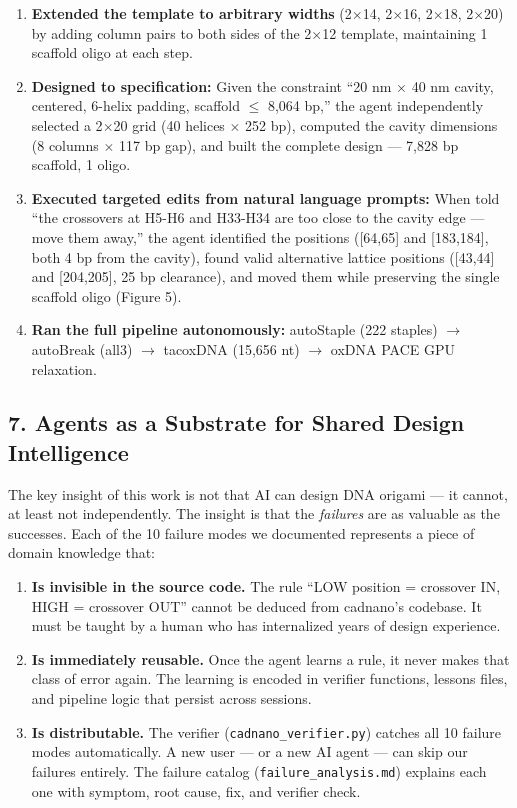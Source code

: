 \documentclass[
  11pt,
]{article}
\providecommand{\tightlist}{%
  \setlength{\itemsep}{0pt}\setlength{\parskip}{0pt}}
\begin{document}
\begin{enumerate}
\def\labelenumi{\arabic{enumi}.}
\tightlist
\item
  \textbf{Extended the template to arbitrary widths} (2$\times$14, 2$\times$16, 2$\times$18,
  2$\times$20) by adding column pairs to both sides of the 2$\times$12 template,
  maintaining 1 scaffold oligo at each step.
\item
  \textbf{Designed to specification:} Given the constraint ``20 nm $\times$ 40
  nm cavity, centered, 6-helix padding, scaffold $\leq$ 8,064 bp,'' the agent
  independently selected a 2$\times$20 grid (40 helices $\times$ 252 bp), computed the
  cavity dimensions (8 columns $\times$ 117 bp gap), and built the complete
  design --- 7,828 bp scaffold, 1 oligo.
\item
  \textbf{Executed targeted edits from natural language prompts:} When
  told ``the crossovers at H5-H6 and H33-H34 are too close to the cavity
  edge --- move them away,'' the agent identified the positions
  ({[}64,65{]} and {[}183,184{]}, both 4 bp from the cavity), found
  valid alternative lattice positions ({[}43,44{]} and {[}204,205{]}, 25
  bp clearance), and moved them while preserving the single scaffold
  oligo (Figure 5).
\item
  \textbf{Ran the full pipeline autonomously:} autoStaple (222 staples)
  $\to$ autoBreak (all3) $\to$ tacoxDNA (15,656 nt) $\to$ oxDNA PACE GPU relaxation.
\end{enumerate}

\subsection{7. Agents as a Substrate for Shared Design
Intelligence}\label{agents-as-a-substrate-for-shared-design-intelligence}

The key insight of this work is not that AI can design DNA origami ---
it cannot, at least not independently. The insight is that the
\emph{failures} are as valuable as the successes. Each of the 10 failure
modes we documented represents a piece of domain knowledge that:

\begin{enumerate}
\def\labelenumi{\arabic{enumi}.}
\tightlist
\item
  \textbf{Is invisible in the source code.} The rule ``LOW position =
  crossover IN, HIGH = crossover OUT'' cannot be deduced from cadnano's
  codebase. It must be taught by a human who has internalized years of
  design experience.
\item
  \textbf{Is immediately reusable.} Once the agent learns a rule, it
  never makes that class of error again. The learning is encoded in
  verifier functions, lessons files, and pipeline logic that persist
  across sessions.
\item
  \textbf{Is distributable.} The verifier
  (\texttt{cadnano\_verifier.py}) catches all 10 failure modes
  automatically. A new user --- or a new AI agent --- can skip our
  failures entirely. The failure catalog (\texttt{failure\_analysis.md})
  explains each one with symptom, root cause, fix, and verifier check.
\end{enumerate}
\end{document}
